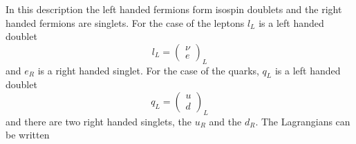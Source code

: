 In this description the left handed fermions form isospin doublets and the right
handed fermions are singlets. For the case of the leptons $l_{L}$ is a left handed doublet 
\begin{equation}
l_{L} = \left( \begin{matrix} \nu \\ e \end{matrix} \right)_{L}
\end{equation}
and $e_{R}$ is a right handed singlet.
For the case of the quarks, $q_{L}$ is a left handed doublet 
\begin{equation}
q_{L} = \left( \begin{matrix} u\\ d \end{matrix} \right)_{L}
\end{equation}
and there are two right handed singlets, the $u_{R}$ and the $d_{R}$.
The Lagrangians can be written
